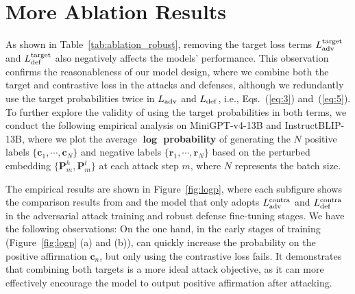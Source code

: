 \section{More Ablation Results}\label{app:ablationresults}


As shown in Table~\ref{tab:ablation_robust}, removing the target loss terms $L^{\rm target}_{\rm adv}$ and $L^{\rm target}_{\rm def}$ also negatively affects the models' performance. This observation confirms the reasonableness of our model design, where we combine both the target and contrastive loss in the attacks and defenses, although we redundantly use the target probabilities twice in $L_{\rm adv}$ and $L_{\rm def}$, i.e., Eqs.~(\ref{eq:3}) and~(\ref{eq:5}). 
To further explore the validity of using the target probabilities in both terms, we conduct the following empirical analysis on MiniGPT-v4-13B and InstructBLIP-13B, where we plot the average \textbf{$\mathbf{\log}$ probability} of generating the $N$ positive labels $\{\mathbf{c}_1, \cdots, \mathbf{c}_N\}$ and negative labels $\{\mathbf{r}_1, \cdots, \mathbf{r}_N\}$ based on the perturbed embedding $\{\mathbf{P}^{h}_{m},\mathbf{P}^{t}_{m}\}$ at each attack step $m$, where $N$ represents the batch size. 

The empirical results are shown in Figure~\ref{fig:logp}, where each subfigure shows the comparison results from {\name} and the model that only adopts $L^{\rm contra}_{\rm adv}$ and $L^{\rm contra}_{\rm def}$ in the adversarial attack training and robust defense fine-tuning stages. We have the following observations: On the one hand, in the early stages of training (Figure~\ref{fig:logp} (a) and (b)), {\name} can quickly increase the probability on the positive affirmation $\mathbf{c}_n$, but only using the contrastive loss fails. It demonstrates that combining both targets is a more ideal attack objective, as it can more effectively encourage the model to output positive affirmation after attacking.


